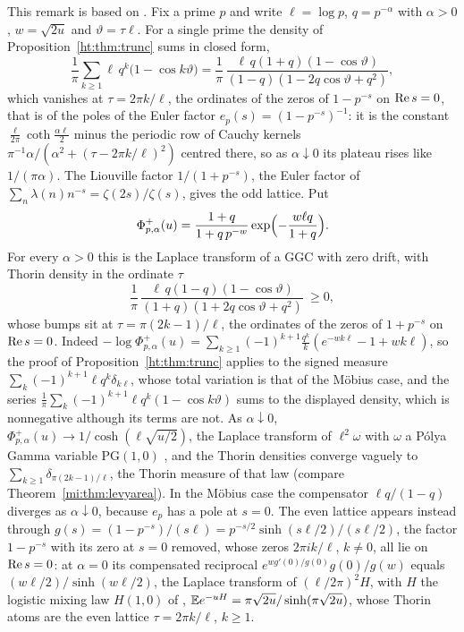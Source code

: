 \begin{remark}\label{ht:rem:blocks}
This remark is based on \cite{PolsonRXi26}. Fix a prime $p$ and write $\ell=\log p$, $q=p^{-\alpha}$ with $\alpha>0$, $w=\sqrt{2u}$ and $\vartheta=\tau \ell$. For a single prime the density of Proposition~\ref{ht:thm:trunc} sums in closed form,
\[
\frac1\pi\sum_{k\ge1}\ell\,q^k\bigl(1-\cos k\vartheta\bigr)=\frac1\pi\,\frac{\ell\,q(1+q)(1-\cos\vartheta)}{(1-q)(1-2q\cos\vartheta+q^2)},
\]
which vanishes at $\tau=2\pi k/\ell$, the ordinates of the zeros of $1-p^{-s}$ on $\operatorname{Re} s=0$, that is of the poles of the Euler factor $e_p(s)=(1-p^{-s})^{-1}$: it is the constant $\frac \ell{2\pi}\coth\frac{\alpha \ell}2$ minus the periodic row of Cauchy kernels $\pi^{-1}\alpha/(\alpha^2+(\tau-2\pi k/\ell)^2)$ centred there, so as $\alpha\downarrow0$ its plateau rises like $1/(\pi\alpha)$. The Liouville factor $1/(1+p^{-s})$, the Euler factor of $\sum_n\lambda(n)n^{-s}=\zeta(2s)/\zeta(s)$, gives the odd lattice. Put
\[
\Phi^{+}_{p,\alpha}(u)=\frac{1+q}{1+q\,p^{-w}}\exp\Bigl(-\frac{w\ell q}{1+q}\Bigr).
\]
For every $\alpha>0$ this is the Laplace transform of a GGC with zero drift, with Thorin density in the ordinate $\tau$
\[
\frac1\pi\,\frac{\ell\,q(1-q)(1-\cos\vartheta)}{(1+q)(1+2q\cos\vartheta+q^2)}\ \ge0,
\]
whose bumps sit at $\tau=\pi(2k-1)/\ell$, the ordinates of the zeros of $1+p^{-s}$ on $\operatorname{Re} s=0$. Indeed $-\log \Phi^{+}_{p,\alpha}(u)=\sum_{k\ge1}(-1)^{k+1}\frac{q^k}k(e^{-wk\ell}-1+wk\ell)$, so the proof of Proposition~\ref{ht:thm:trunc} applies to the signed measure $\sum_k(-1)^{k+1}\ell q^k\delta_{k\ell}$, whose total variation is that of the M\"obius case, and the series $\frac1\pi\sum_k(-1)^{k+1}\ell q^k(1-\cos k\vartheta)$ sums to the displayed density, which is nonnegative although its terms are not. As $\alpha\downarrow0$, $\Phi^{+}_{p,\alpha}(u)\to1/\cosh(\ell\sqrt{u/2})$, the Laplace transform of $\ell^2\omega$ with $\omega$ a P\'olya Gamma variable $\mathrm{PG}(1,0)$ \cite{PSW13}, and the Thorin densities converge vaguely to $\sum_{k\ge1}\delta_{\pi(2k-1)/\ell}$, the Thorin measure of that law (compare Theorem~\ref{mi:thm:levyarea}). In the M\"obius case the compensator $\ell q/(1-q)$ diverges as $\alpha\downarrow0$, because $e_p$ has a pole at $s=0$. The even lattice appears instead through $g(s)=(1-p^{-s})/(s\ell)=p^{-s/2}\sinh(s\ell/2)/(s\ell/2)$, the factor $1-p^{-s}$ with its zero at $s=0$ removed, whose zeros $2\pi ik/\ell$, $k\ne0$, all lie on $\operatorname{Re} s=0$: at $\alpha=0$ its compensated reciprocal $e^{wg'(0)/g(0)}g(0)/g(w)$ equals $(w\ell/2)/\sinh(w\ell/2)$, the Laplace transform of $(\ell/2\pi)^2H$, with $H$ the logistic mixing law $H(1,0)$ of \cite{BNKS82}, $\mathbb{E} e^{-uH}=\pi\sqrt{2u}/\sinh(\pi\sqrt{2u})$, whose Thorin atoms are the even lattice $\tau=2\pi k/\ell$, $k\ge1$.


\end{remark}

